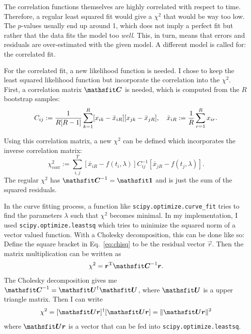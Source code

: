 \documentclass[11pt, english, fleqn, DIV=15, headinclude]{scrartcl}
\begin{document}
The correlation functions themselves are highly correlated with respect to
time. Therefore, a regular least squared fit would give a $\chi^2$ that would
be way too low. The $p$-values usually end up around 1, which does not imply a
perfect fit but rather that the data fits the model too \emph{well}. This, in
turn, means that errors and residuals are over-estimated with the given model.
A different model is called for: the correlated fit.

For the correlated fit, a new likelihood function is needed. I chose to keep
the least squared likelihood function but incorporate the correlation into the
$\chi^2$. First, a correlation matrix $\tens C$ is needed, which is computed
from the $R$ bootstrap samples:
\begin{equation}
    \label{eq:correlation_matrix}
    C_{ij} := \frac{1}{R[R-1]} \sum_{k=1}^R
    [x_{ik} - \bar x_{iR}] [x_{jk} - \bar x_{jR}]
    ,\quad
    \bar x_{iR} := \frac 1R \sum_{r=1}^R x_{ir}.
\end{equation}

Using this correlation matrix, a new $\chi^2$ can be defined which incorporates
the inverse correlation matrix:
\begin{equation}
    \label{eq:chisq}
    \chi^2_\text{corr} := \sum_{i, j}^T
    \left[ \bar x_{iR} - f(t_i, \lambda) \right]
    C^{-1}_{ij}
    \left[ \bar x_{jR} - f(t_j, \lambda) \right].
\end{equation}
The regular $\chi^2$ has $\tens C^{-1} = \tens 1$ and is just the sum of the
squared residuals.

In the curve fitting process, a function like
\texttt{scipy.optimize.curve\_fit} tries to find the parameters $\lambda$ such
that $\chi^2$ becomes minimal. In my implementation, I used
\texttt{scipy.optimize.leastsq} which tries to minimize the squared norm of a
vector valued function. With a Cholesky decomposition, this can be done like
so: Define the square bracket in Eq.~\eqref{eq:chisq} to be the residual vector
$\vec r$. Then the matrix multiplication can be written as
\begin{equation}
    \chi^2 = \vec r^\text T \tens C^{-1} \vec r.
\end{equation}
The Cholesky decomposition gives me $\tens C^{-1} = \tens U^\dagger \tens U$,
where $\tens U$ is a upper triangle matrix. Then I can write
\begin{equation}
    \chi^2 = [\tens U \vec r]^\dagger [\tens U \vec r]
    = \| \tens U \vec r \|^2
\end{equation}
where $\tens U \vec r$ is a vector that can be fed into
\texttt{scipy.optimize.leastsq}.
\end{document}
